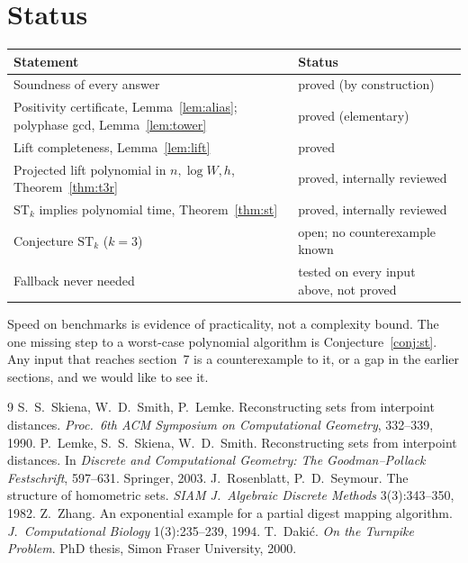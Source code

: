 \documentclass[11pt]{article}
\theoremstyle{definition}
\begin{document}
\section{Status}

\begin{center}\small
\begin{tabular}{@{}ll@{}}
\toprule
Statement & Status \\
\midrule
Soundness of every answer & proved (by construction) \\
Positivity certificate, Lemma~\ref{lem:alias}; polyphase gcd, Lemma~\ref{lem:tower} & proved (elementary) \\
Lift completeness, Lemma~\ref{lem:lift} & proved \\
Projected lift polynomial in $n,\log W,h$, Theorem~\ref{thm:t3r} & proved, internally reviewed \\
$\mathrm{ST}_k$ implies polynomial time, Theorem~\ref{thm:st} & proved, internally reviewed \\
Conjecture $\mathrm{ST}_k$ ($k=3$) & open; no counterexample known \\
Fallback never needed & tested on every input above, not proved \\
\bottomrule
\end{tabular}
\end{center}

Speed on benchmarks is evidence of practicality, not a complexity bound. The one missing step to a worst-case
polynomial algorithm is Conjecture~\ref{conj:st}. Any input that reaches section~7 is a counterexample to it, or a
gap in the earlier sections, and we would like to see it.

\begin{thebibliography}{9}
 S.~S.~Skiena, W.~D.~Smith, P.~Lemke. Reconstructing sets from interpoint distances.
  \emph{Proc.\ 6th ACM Symposium on Computational Geometry}, 332--339, 1990.
 P.~Lemke, S.~S.~Skiena, W.~D.~Smith. Reconstructing sets from interpoint distances. In
  \emph{Discrete and Computational Geometry: The Goodman--Pollack Festschrift}, 597--631. Springer, 2003.
 J.~Rosenblatt, P.~D.~Seymour. The structure of homometric sets. \emph{SIAM J.\ Algebraic Discrete
  Methods} 3(3):343--350, 1982.
 Z.~Zhang. An exponential example for a partial digest mapping algorithm. \emph{J.\ Computational
  Biology} 1(3):235--239, 1994.
 T.~Daki\'c. \emph{On the Turnpike Problem}. PhD thesis, Simon Fraser University, 2000.
\end{thebibliography}
\end{document}

